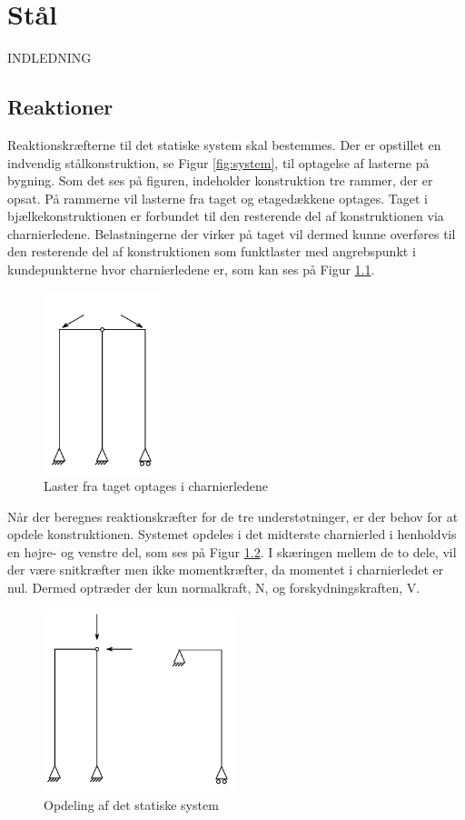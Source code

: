 \chapter{Stål}
INDLEDNING

\section{Reaktioner}
Reaktionskræfterne til det statiske system skal bestemmes. Der er opstillet en indvendig stålkonstruktion, se Figur \ref{fig:system}, til optagelse af lasterne på bygning. Som det ses på figuren, indeholder konstruktion tre rammer, der er opsat. På rammerne vil lasterne fra taget og etagedækkene optages. Taget i bjælkekonstruktionen er forbundet til den resterende del af konstruktionen via charnierledene. Belastningerne der virker på taget vil dermed kunne overføres til den resterende del af konstruktionen som funktlaster med angrebspunkt i kundepunkterne hvor charnierledene er, som kan ses på Figur \ref{fig:del2}. 

\begin{figure}[htbp]
	\centering
	\includegraphics[width=0.3\textwidth]{billeder/delto.png}
	\caption{Laster fra taget optages i charnierledene}
	\label{fig:del2}
\end{figure}

Når der beregnes reaktionskræfter for de tre understøtninger, er der behov for at opdele konstruktionen. Systemet opdeles i det midterste charnierled i henholdvis en højre- og venstre del, som ses på Figur \ref{fig:opdeling}. I skæringen mellem de to dele, vil der være snitkræfter men ikke momentkræfter, da momentet i charnierledet er nul. Dermed optræder der kun normalkraft, N, og forskydningskraften, V.

\begin{figure}[htbp]
	\centering
	\includegraphics[width=0.5\textwidth]{billeder/systemopdeling.png}
	\caption{Opdeling af det statiske system}
	\label{fig:opdeling}
\end{figure}
 
